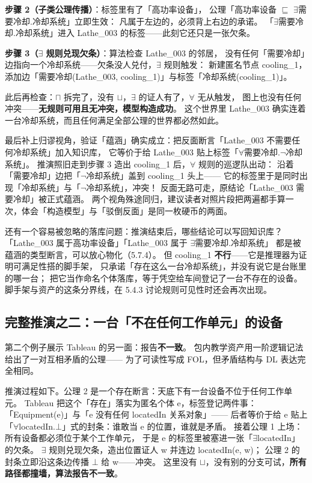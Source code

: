 \textbf{步骤 2（子类公理传播）}：标签里有了「高功率设备」，
公理「高功率设备 \(\sqsubseteq\) \(\exists\)需要冷却.冷却系统」立即生效：
凡属于左边的，必须背上右边的承诺。
「\(\exists\)需要冷却.冷却系统」进入 Lathe\_003 的标签——此刻它还只是一张欠条。

\textbf{步骤 3（\(\exists\) 规则兑现欠条）}：算法检查 Lathe\_003 的邻居，
没有任何「需要冷却」边指向一个冷却系统——欠条没人兑付，\(\exists\) 规则触发：
新建匿名节点 cooling\_1，添加边「需要冷却(Lathe\_003, cooling\_1)」与标签「冷却系统(cooling\_1)」。

此后再检查：\(\sqcap\) 拆完了，没有 \(\sqcup\)，\(\exists\) 的证人有了，\(\forall\) 无从触发，
图上也没有任何冲突——\textbf{无规则可用且无冲突，模型构造成功}。
这个世界里 Lathe\_003 确实连着一台冷却系统，而且任何满足全部公理的世界都必然如此。

最后补上归谬视角，验证「蕴涵」确实成立：把反面断言「Lathe\_003 不需要任何冷却系统」加入知识库，
它等价于给 Lathe\_003 贴上标签「\(\forall\)需要冷却.\(\lnot\)冷却系统」。
推演照旧走到步骤 3 造出 cooling\_1 后，\(\forall\) 规则的巡逻队出动：
沿着「需要冷却」边把「\(\lnot\)冷却系统」盖到 cooling\_1 头上——
它的标签里于是同时出现「冷却系统」与「\(\lnot\)冷却系统」，冲突！
反面无路可走，原结论「Lathe\_003 需要冷却」被正式蕴涵。
两个视角殊途同归，建议读者对照片段把两遍都手算一次，体会「构造模型」与「驳倒反面」是同一枚硬币的两面。

还有一个容易被忽略的落库问题：推演结束后，哪些结论可以写回知识库？
「Lathe\_003 属于高功率设备」「Lathe\_003 属于 \(\exists\)需要冷却.冷却系统」
都是被蕴涵的类型断言，可以放心物化（5.7.4）。
但 cooling\_1 \textbf{不行}——它是推理器为证明可满足性搭的脚手架，
只承诺「存在这么一台冷却系统」，并没有说它是台账里的哪一台；
把它当作命名个体落库，等于凭空给车间登记了一台不存在的设备。
脚手架与资产的这条分界线，在 5.4.3 讨论规则可见性时还会再次出现。

\subsection{完整推演之二：一台「不在任何工作单元」的设备}

第二个例子展示 Tableau 的另一面：报告\textbf{不一致}。
包内教学资产用一阶逻辑记法给出了一对互相矛盾的公理——
为了可读性写成 FOL，但矛盾结构与 DL 表达完全相同。



推演过程如下。公理 2 是一个存在断言：天底下有一台设备不位于任何工作单元。
Tableau 把这个「存在」落实为匿名个体 e，标签登记两件事：
「Equipment(e)」与「e 没有任何 locatedIn 关系对象」——
后者等价于给 e 贴上「\(\forall\)locatedIn.\(\bot\)」式的封条：谁敢当 e 的位置，谁就是矛盾。
接着公理 1 上场：所有设备都必须位于某个工作单元，
于是 e 的标签里被塞进一张「\(\exists\)locatedIn」的欠条。
\(\exists\) 规则兑现欠条，造出位置证人 w 并连边 locatedIn(e, w)；
公理 2 的封条立即沿这条边传播 \(\bot\) 给 w——冲突。
这里没有 \(\sqcup\)，没有别的分支可试，\textbf{所有路径都撞墙，算法报告不一致}。

